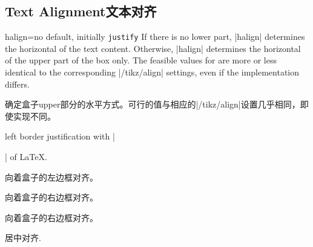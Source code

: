 \setcounter{section}{4}
\setcounter{subsection}{5}
\setcounter{subsubsection}{0}
 
\subsection{Text Alignment文本对齐}
\begin{docTcbKey}[][doc new=2015-05-07]{halign}{=}{no default, initially \texttt{justify}}
If there is no lower part, |halign| determines the horizontal 
of the text content.
Otherwise, |halign| determines the horizontal 
of the upper part of the box only.
The feasible values for  are more or less identical to
the corresponding |/tikz/align| settings, even if the implementation differs.

确定盒子upper部分的水平方式。可行的值与相应的|/tikz/align|设置几乎相同，即使实现不同。\\[1em]





{left border justification with |\raggedright| of \LaTeX.}
{向着盒子的左边框对齐。}%

{向着盒子的右边框对齐。}%

{向着盒子的右边框对齐。}%

{居中对齐.}%


\end{docTcbKey}
